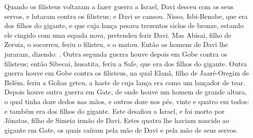 {  Quando os filisteus voltaram a fazer guerra a Israel, Davi desceu com os seus servos, e lutaram contra os filisteus; e Davi se cansou.
  Nisso, Isbi-Benobe, que era dos filhos do gigante, e que cuja lança pesava trezentos siclos de bronze, estando ele cingido com uma espada nova, pretendeu ferir Davi.
  Mas Abisai, filho de Zeruia, o socorreu, feriu o filisteu, e o matou. Então os homens de Davi lhe juraram, dizendo: .
  Outra segunda guerra houve depois em Gobe contra os filisteus; então Sibecai, husatita, feriu a Safe, que era dos filhos do gigante.
  Outra guerra houve em Gobe contra os filisteus, na qual Elanã, filho de Jaaré-Oregim de Belém, feriu a Golias geteu, a haste de cuja lança era como um lançador de tear.
  Depois houve outra guerra em Gate, de onde houve um homem de grande altura, o qual tinha doze dedos nas mãos, e outros doze nos pés, vinte e quatro em todos: e também era dos filhos do gigante.
  Este desafiou a Israel, e foi morto por Jônatas, filho de Simeia irmão de Davi.
  Estes quatro lhe haviam nascido ao gigante em Gate, os quais caíram pela mão de Davi e pela mão de seus servos.
\par }

